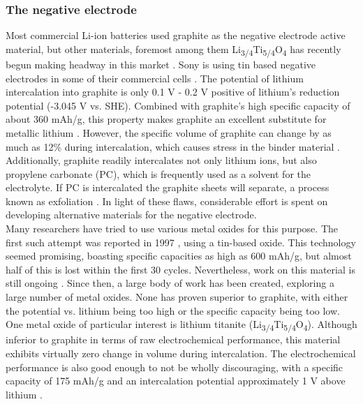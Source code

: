 \documentclass[12pt]{article} %
\begin{document}

\subsubsection{The negative electrode} %

Most commercial Li-ion batteries used graphite as the negative electrode active material, but other materials, foremost among them Li\textsubscript{3/4}Ti\textsubscript{5/4}O\textsubscript{4} has recently begun making headway in this market \cite{kulova_new_2013}.
Sony is using tin based negative electrodes in some of their commercial cells \cite{reddy_thomas_section_2011-2}.
The potential of lithium intercalation into graphite is only 0.1 V - 0.2 V positive of lithium's reduction potential (-3.045 V vs. SHE).
Combined with graphite's high specific capacity of about 360 mAh/g, this property makes graphite an excellent substitute for metallic lithium \cite{reddy_thomas_figure_2011} \cite{reddy_thomas_figure_2011-1}.
However, the specific volume of graphite can change by as much as 12\% during intercalation, which causes stress in the binder material \cite{kulova_new_2013}.
Additionally, graphite readily intercalates not only lithium ions, but also propylene carbonate (PC), which is frequently used as a solvent for the electrolyte.
If PC is intercalated the graphite sheets will separate, a process known as exfoliation \cite{reddy_thomas_section_2011-2}.
In light of these flaws, considerable effort is spent on developing alternative materials for the negative electrode.
\\
Many researchers have tried to use various metal oxides for this purpose.
The first such attempt was reported in 1997 \cite{idota_tin-based_1997}, using a tin-based oxide.
This technology seemed promising, boasting specific capacities as high as 600 mAh/g, but almost half of this is lost within the first 30 cycles.
Nevertheless, work on this material is still ongoing \cite{kulova_new_2013}.
Since then, a large body of work has been created, exploring a large number of metal oxides.
None has proven superior to graphite, with either the potential vs. lithium being too high or the specific capacity being too low.
One metal oxide of particular interest is lithium titanite (Li\textsubscript{3/4}Ti\textsubscript{5/4}O\textsubscript{4}).
Although inferior to graphite in terms of raw electrochemical performance, this material exhibits virtually zero change in volume during intercalation.
The electrochemical performance is also good enough to not be wholly discouraging, with a specific capacity of 175 mAh/g and an intercalation potential approximately 1 V above lithium \cite{kulova_new_2013} \cite{reddy_thomas_figure_2011}.
\end{document}
